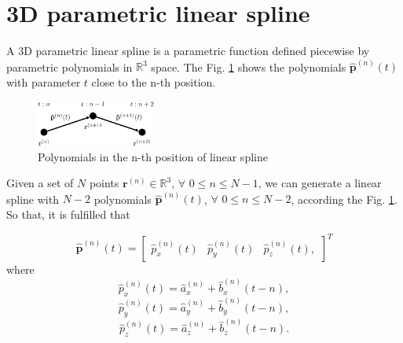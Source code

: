 \section{3D parametric linear spline }
A 3D parametric linear spline is a parametric function defined piecewise by parametric polynomials in $\mathbb{R}^{3}$ space.
The Fig. \ref{fig:3DLinearSplinePoly} shows the polynomials $\mathbf{\hat{p}}^{(n)}(t)$ with parameter $t$ 
close to the n-th position.
\begin{figure}[H]
    \centering
    \includegraphics[width=0.35\textwidth]{boveda/Diagrama0.eps}
    \caption{Polynomials in the n-th position of linear spline}
    \label{fig:3DLinearSplinePoly}
\end{figure}

Given a set of $N$ points $\mathbf{r}^{(n)}\in\mathbb{R}^{3}$, $\forall$ $0\leq n \leq N-1$, 
we can generate a linear spline with $N-2$ polynomials $\mathbf{\hat{p}}^{(n)}(t)$, $\forall$ $0\leq n \leq N-2$, 
according the Fig. \ref{fig:3DLinearSplinePoly}.
So that, it is fulfilled that 

\begin{equation}
\mathbf{\hat{p}}^{(n)}(t)=
\begin{bmatrix}
\hat{p}_{x}^{(n)}(t) & \hat{p}_{y}^{(n)}(t) & \hat{p}_{z}^{(n)}(t),
\end{bmatrix}^{T}
\end{equation}
where
\begin{equation}
\hat{p}_{x}^{(n)}(t)=\hat{a}_{x}^{(n)}+\hat{b}_{x}^{(n)}(t-n),
\end{equation}
\begin{equation}
\hat{p}_{y}^{(n)}(t)=\hat{a}_{y}^{(n)}+\hat{b}_{y}^{(n)}(t-n),
\end{equation}
\begin{equation}
\hat{p}_{z}^{(n)}(t)=\hat{a}_{z}^{(n)}+\hat{b}_{z}^{(n)}(t-n).
\end{equation}




